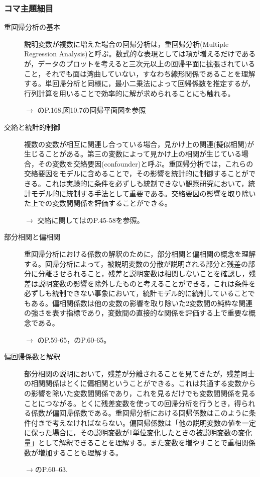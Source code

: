 \subsubsection{コマ主題細目}
\begin{description}
	\item[重回帰分析の基本] 説明変数が複数に増えた場合の回帰分析は，重回帰分析(Multiple Regression Analysis)と呼ぶ。数式的な表現としては項が増えるだけであるが，データのプロットを考えると三次元以上の回帰平面に拡張されていること，それでも面は湾曲していない，すなわち線形関係であることを理解する。単回帰分析と同様に，最小二乗法によって回帰係数を推定するが，行列計算を用いることで効率的に解が求められることにも触れる。
	      \begin{flushright}
		      $\to$ \textcite{kosugi2019}のP.168,図10.7の回帰平面図を参照
	      \end{flushright}

	\item[交絡と統計的制御] 複数の変数が相互に関連し合っている場合，見かけ上の関連(擬似相関)が生じることがある。第三の変数によって見かけ上の相関が生じている場合，その変数を交絡要因(confounder)と呼ぶ。重回帰分析では，これらの交絡要因をモデルに含めることで，その影響を統計的に制御することができる。これは実験的に条件を必ずしも統制できない観察研究において，統計モデル的に統制する手法として重要である。交絡要因の影響を取り除いた上での変数間関係を評価することができる。
	      \begin{flushright}
		      $\to$ 交絡に関しては\textcite{Toyoda1992}のP.45-58を参照。
	      \end{flushright}

	\item[部分相関と偏相関] 重回帰分析における係数の解釈のために，部分相関と偏相関の概念を理解する。回帰分析によって，被説明変数の分散が説明される部分と残差の部分に分離させられること，残差と説明変数は相関しないことを確認し，残差は説明変数の影響を除外したものと考えることができる。これは条件を必ずしも統制できない事象において，統計モデル的に統制していることでもある。偏相関係数は他の変数の影響を取り除いた2変数間の純粋な関連の強さを表す指標であり，変数間の直接的な関係を評価する上で重要な概念である。
	      \begin{flushright}
		      $\to$ \textcite{Kawabata201408}のP.59-65，\textcite{Yamada2004}のP.60-65。
	      \end{flushright}

	\item[偏回帰係数と解釈] 部分相関の説明において，残差が分離されることを見てきたが，残差同士の相関関係はとくに偏相関ということができる。これは共通する変数からの影響を除いた変数間関係であり，これを見るだけでも変数間関係を見ることにつながる。とくに残差変数を使っての回帰分析を行うとき，得られる係数が偏回帰係数である。重回帰分析における回帰係数はこのように条件付きで考えなければならない。偏回帰係数は「他の説明変数の値を一定に保った場合に，その説明変数が1単位変化したときの被説明変数の変化量」として解釈できることを理解する。また変数を増やすことで重相関係数が増加することも理解する。
	      \begin{flushright}
		      $\to$\textcite{kosugi2018}のP.60--63.
	      \end{flushright}


\end{description}
